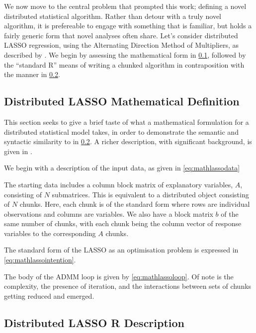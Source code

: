 We now move to the central problem that prompted this work; defining a novel distributed statistical algorithm.
Rather than detour with a truly novel algorithm, it is prefereable to engage with something that is familiar, but holds a fairly generic form that novel analyses often share.
Let's consider distributed LASSO regression, using the Alternating Direction Method of Multipliers, as described by \textcite{mateos2010}.
We begin by assessing the mathematical form in \cref{sec:mathlasso}, followed by the ``standard R'' means of writing a chunked algorithm in contraposition with the \lsr manner in \cref{sec:rlasso}.

\subsection{Distributed LASSO Mathematical Definition}\label{sec:mathlasso}

This section seeks to give a brief taste of what a mathematical formulation for a distributed statistical model takes, in order to demonstrate the semantic and syntactic similarity to \lsr in \cref{sec:rlasso}.
A richer description, with significant background, is given in \textcite{boyd2011}.

We begin with a description of the input data, as given in \cref{eq:mathlassodata}


The starting data includes a column block matrix of explanatory variables, $A$, consisting of $N$ submatrices.
This is equivalent to a distributed object consisting of $N$ chunks.
Here, each chunk is of the standard form where rows are individual observations and columns are variables.
We also have a block matrix $b$ of the same number of chunks, with each chunk being the column vector of response variables to the corresponding $A$ chunks.

The standard form of the LASSO as an optimisation problem is expressed in \cref{eq:mathlassointention}.


The body of the ADMM loop is given by \cref{eq:mathlassoloop}.
Of note is the complexity, the presence of iteration, and the interactions between sets of chunks getting reduced and emerged.


\subsection{Distributed LASSO R Description}\label{sec:rlasso}

